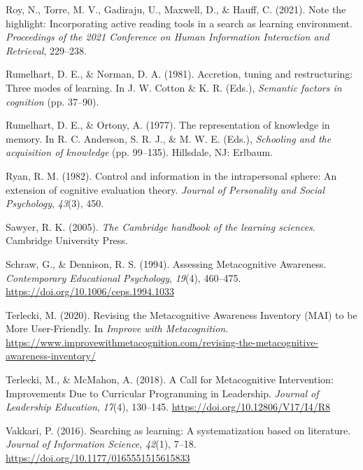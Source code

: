 \documentclass[letterpaper, nobind]{templates/ociamthesis}
\newlength{\cslhangindent}
\newenvironment{CSLReferences}[2] %
 {%
  \setlength{\parindent}{0pt}
  \ifodd #1
  \let\oldpar\par
  \def\par{\hangindent=\cslhangindent\oldpar}
  \fi
  \setlength{\parskip}{1mm}
  \setlength{\baselineskip}{6mm}
 }%
 {}
\begin{document}
\begin{CSLReferences}{1}{0}
\leavevmode{}%
Roy, N., Torre, M. V., Gadiraju, U., Maxwell, D., \& Hauff, C. (2021). Note the highlight: Incorporating active reading tools in a search as learning environment. \emph{Proceedings of the 2021 Conference on Human Information Interaction and Retrieval}, 229--238.

\leavevmode{}%
Rumelhart, D. E., \& Norman, D. A. (1981). Accretion, tuning and restructuring: Three modes of learning. In J. W. Cotton \& K. R. (Eds.), \emph{Semantic factors in cognition} (pp. 37--90).

\leavevmode{}%
Rumelhart, D. E., \& Ortony, A. (1977). The representation of knowledge in memory. In R. C. Anderson, S. R. J., \& M. W. E. (Eds.), \emph{Schooling and the acquisition of knowledge} (pp. 99--135). Hillsdale, NJ: Erlbaum.

\leavevmode{}%
Ryan, R. M. (1982). Control and information in the intrapersonal sphere: An extension of cognitive evaluation theory. \emph{Journal of Personality and Social Psychology}, \emph{43}(3), 450.

\leavevmode{}%
Sawyer, R. K. (2005). \emph{The {Cambridge} handbook of the learning sciences}. {Cambridge University Press}.

\leavevmode{}%
Schraw, G., \& Dennison, R. S. (1994). Assessing {Metacognitive Awareness}. \emph{Contemporary Educational Psychology}, \emph{19}(4), 460--475. \url{https://doi.org/10.1006/ceps.1994.1033}

\leavevmode{}%
Terlecki, M. (2020). Revising the {Metacognitive Awareness Inventory} ({MAI}) to be {More User}-{Friendly}. In \emph{Improve with Metacognition}. \url{https://www.improvewithmetacognition.com/revising-the-metacognitive-awareness-inventory/}

\leavevmode{}%
Terlecki, M., \& McMahon, A. (2018). A {Call} for {Metacognitive Intervention}: Improvements {Due} to {Curricular Programming} in {Leadership}. \emph{Journal of Leadership Education}, \emph{17}(4), 130--145. \url{https://doi.org/10.12806/V17/I4/R8}

\leavevmode{}%
Vakkari, P. (2016). Searching as learning: A systematization based on literature. \emph{Journal of Information Science}, \emph{42}(1), 7--18. \url{https://doi.org/10.1177/0165551515615833}


\end{CSLReferences}
\end{document}
